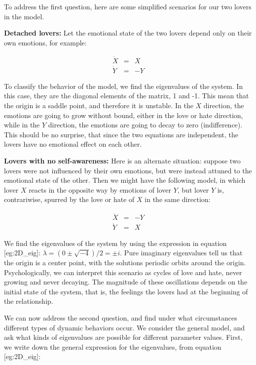 \documentclass[
  letterpaper,
  DIV=11,
  numbers=noendperiod]{scrreprt}
\begin{document}
To address the first question, here are some simplified scenarios for
our two lovers in the model.

\textbf{Detached lovers:} Let the emotional state of the two lovers
depend only on their own emotions, for example:

\[
\begin{aligned}
\dot  X & = & X \\
\dot  Y & = &  -Y
\end{aligned}
\]

To classify the behavior of the model, we find the eigenvalues of the
system. In this case, they are the diagonal elements of the matrix, 1
and -1. This mean that the origin is a saddle point, and therefore it is
unstable. In the \(X\) direction, the emotions are going to grow without
bound, either in the love or hate direction, while in the \(Y\)
direction, the emotions are going to decay to zero (indifference). This
should be no surprise, that since the two equations are independent, the
lovers have no emotional effect on each other.

\textbf{Lovers with no self-awareness:} Here is an alternate situation:
suppose two lovers were not influenced by their own emotions, but were
instead attuned to the emotional state of the other. Then we might have
the following model, in which lover \(X\) reacts in the opposite way by
emotions of lover \(Y\), but lover \(Y\) is, contrariwise, spurred by
the love or hate of \(X\) in the same direction:

\[
\begin{aligned}
\dot  X & = & -Y \\
\dot  Y & = &  X
\end{aligned}
\]

We find the eigenvalues of the system by using the expression in
equation {[}eg:2D\_eig{]}: \(\lambda = (0 \pm \sqrt{-4})/2 = \pm i\).
Pure imaginary eigenvalues tell us that the origin is a center point,
with the solutions periodic orbits around the origin. Psychologically,
we can interpret this scenario as cycles of love and hate, never growing
and never decaying. The magnitude of these oscillations depends on the
initial state of the system, that is, the feelings the lovers had at the
beginning of the relationship.

We can now address the second question, and find under what
circumstances different types of dynamic behaviors occur. We consider
the general model, and ask what kinds of eigenvalues are possible for
different parameter values. First, we write down the general expression
for the eigenvalues, from equation {[}eg:2D\_eig{]}:
\end{document}
